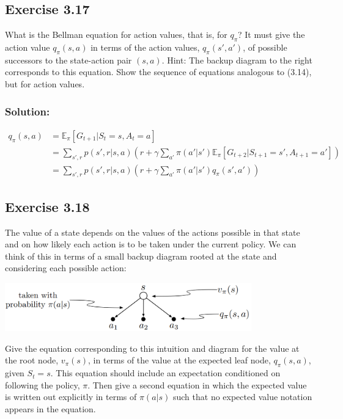 \subsection*{Exercise 3.17}
What is the Bellman equation for action values, that
is, for $q_\pi$? It must give the action value $q_\pi(s,a)$ in terms of the action
values, $q_\pi(s',a')$, of possible successors to the state-action pair $(s,a)$.
Hint: The backup diagram to the right corresponds to this equation.
Show the sequence of equations analogous to (3.14), but for action
values.

\subsubsection*{Solution:}

\begin{align*}
    q_\pi(s, a) &= \mathbb{E}_{\pi} \left[G_{t+1} | S_t = s, A_t = a \right] \\
    &= \sum_{s',r} p(s', r | s, a) \left(r + \gamma \sum_{a'} \pi(a'|s') \mathbb{E}_{\pi} \left[G_{t+2} | S_{t+1} = s', A_{t+1} = a' \right]\right) \\
    &= \sum_{s',r} p(s', r | s, a) \left(r + \gamma \sum_{a'} \pi(a'|s') q_\pi(s',a')\right)
\end{align*}

\subsection*{Exercise 3.18}
The value of a state depends on the values of the actions possible in that
state and on how likely each action is to be taken under the current policy. We can
think of this in terms of a small backup diagram rooted at the state and considering each
possible action:

\begin{center}
\includegraphics[width=0.8\textwidth]{chapters_latex/figures/ex_03_18.png}
\end{center}

Give the equation corresponding to this intuition and diagram for the value at the root
node, $v_\pi(s)$, in terms of the value at the expected leaf node, $q_\pi(s,a)$, given $S_t = s$. This
equation should include an expectation conditioned on following the policy, $\pi$. Then give
a second equation in which the expected value is written out explicitly in terms of $\pi(a|s)$
such that no expected value notation appears in the equation.

